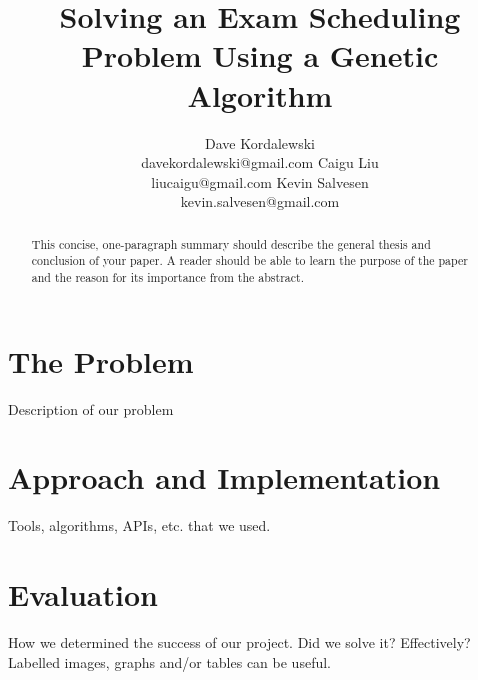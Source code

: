\documentclass[letterpaper]{article}
\title{Solving an Exam Scheduling Problem Using a Genetic Algorithm}
\author{Dave Kordalewski \\ davekordalewski@gmail.com
   \And Caigu Liu \\liucaigu@gmail.com
   \And Kevin Salvesen \\ kevin.salvesen@gmail.com}
\begin{document}
\maketitle

\begin{abstract}
  This concise, one-paragraph summary should describe the general thesis
  and conclusion of your paper. A reader should be able to learn the purpose
  of the paper and the reason for its importance from the abstract.
\end{abstract}

\section{The Problem}
  Description of our problem

\section{Approach and Implementation}
  Tools, algorithms, APIs, etc. that we used.

\section{Evaluation}
  How we determined the success of our project. Did we solve it? Effectively?
  Labelled images, graphs and/or tables can be useful.

% 
% 
\end{document}
